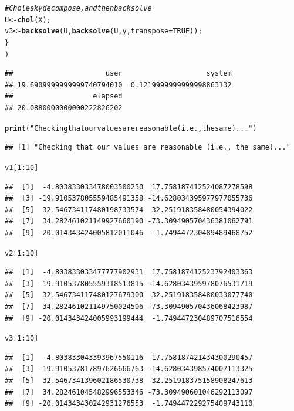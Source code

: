 \documentclass{article}\usepackage[]{graphicx}\usepackage[]{color}
\makeatletter
\newcommand{\hlnum}[1]{\textcolor[rgb]{0.686,0.059,0.569}{#1}}%
\newcommand{\hlstr}[1]{\textcolor[rgb]{0.192,0.494,0.8}{#1}}%
\newcommand{\hlcom}[1]{\textcolor[rgb]{0.678,0.584,0.686}{\textit{#1}}}%
\newcommand{\hlopt}[1]{\textcolor[rgb]{0,0,0}{#1}}%
\newcommand{\hlstd}[1]{\textcolor[rgb]{0.345,0.345,0.345}{#1}}%
\newcommand{\hlkwb}[1]{\textcolor[rgb]{0.69,0.353,0.396}{#1}}%
\newcommand{\hlkwc}[1]{\textcolor[rgb]{0.333,0.667,0.333}{#1}}%
\newcommand{\hlkwd}[1]{\textcolor[rgb]{0.737,0.353,0.396}{\textbf{#1}}}%
\newenvironment{kframe}{%
 \def\at@end@of@kframe{}%
 \ifinner\ifhmode%
  \def\at@end@of@kframe{\end{minipage}}%
  \begin{minipage}{\columnwidth}%
 \fi\fi%
 \def\FrameCommand##1{\hskip\@totalleftmargin \hskip-\fboxsep
 \colorbox{shadecolor}{##1}\hskip-\fboxsep
     \hskip-\linewidth \hskip-\@totalleftmargin \hskip\columnwidth}%
 \MakeFramed {\advance\hsize-\width
   \@totalleftmargin\z@ \linewidth\hsize
   \@setminipage}}%
 {\par\unskip\endMakeFramed%
 \at@end@of@kframe}
\newenvironment{knitrout}{}{} %
\makeatother
\begin{document}
\begin{knitrout}
\begin{kframe}
\begin{alltt}
    \hlcom{# Cholesky decompose, and then backsolve}
    \hlstd{U} \hlkwb{<-} \hlkwd{chol}\hlstd{(X);}
    \hlstd{v3} \hlkwb{<-} \hlkwd{backsolve}\hlstd{(U,} \hlkwd{backsolve}\hlstd{(U, y,} \hlkwc{transpose}\hlstd{=}\hlnum{TRUE}\hlstd{));}
  \hlstd{\}}
\hlstd{)}
\end{alltt}
\begin{verbatim}
##                      user                    system 
## 19.6909999999999740794010  0.1219999999999998863132 
##                   elapsed 
## 20.0880000000000222826202
\end{verbatim}
\begin{alltt}
\hlkwd{print}\hlstd{(}\hlstr{"Checking that our values are reasonable (i.e., the same)..."}\hlstd{)}
\end{alltt}
\begin{verbatim}
## [1] "Checking that our values are reasonable (i.e., the same)..."
\end{verbatim}
\begin{alltt}
\hlstd{v1[}\hlnum{1}\hlopt{:}\hlnum{10}\hlstd{]}
\end{alltt}
\begin{verbatim}
##  [1]  -4.803833033478003500250  17.758187412524087278598
##  [3] -19.910537805559485491358 -14.628034395977977055736
##  [5]  32.546734117480198733574  32.251918358480054394022
##  [7]  34.282461021149927660190 -73.309490570436381062791
##  [9] -20.014343424005812011046  -1.749447230489489468752
\end{verbatim}
\begin{alltt}
\hlstd{v2[}\hlnum{1}\hlopt{:}\hlnum{10}\hlstd{]}
\end{alltt}
\begin{verbatim}
##  [1]  -4.803833033477777902931  17.758187412523792403363
##  [3] -19.910537805559318513815 -14.628034395978076531719
##  [5]  32.546734117480127679300  32.251918358480033077740
##  [7]  34.282461021149750024506 -73.309490570436068423987
##  [9] -20.014343424005993199444  -1.749447230489707516554
\end{verbatim}
\begin{alltt}
\hlstd{v3[}\hlnum{1}\hlopt{:}\hlnum{10}\hlstd{]}
\end{alltt}
\begin{verbatim}
##  [1]  -4.803833043393967550116  17.758187421434300290457
##  [3] -19.910537817897626666763 -14.628034398574007113325
##  [5]  32.546734139602186530738  32.251918375158908247613
##  [7]  34.282461045482996553346 -73.309490601046292113097
##  [9] -20.014343430242931276553  -1.749447229275409743110
\end{verbatim}
\end{kframe}
\end{knitrout}
\end{document}
